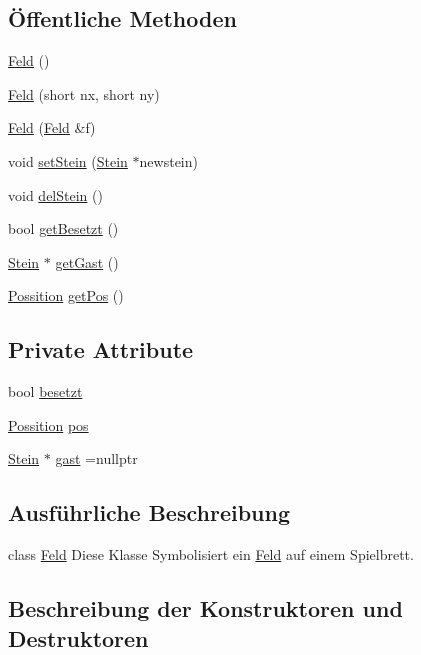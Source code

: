 \subsection*{Öffentliche Methoden}
\begin{DoxyCompactItemize}
\item 
\hyperlink{class_feld_a8a3098df53c8ae2ef988d0d2e34be1db}{Feld} ()
\item 
\hyperlink{class_feld_a5305572f4799035e118ff6c5e87df7f3}{Feld} (short nx, short ny)
\item 
\hyperlink{class_feld_a6594ff1a9881daa807483ea3754e16d0}{Feld} (\hyperlink{class_feld}{Feld} \&f)
\item 
void \hyperlink{class_feld_a00d3eec0ced82a8aee97de9b5f030df2}{set\+Stein} (\hyperlink{class_stein}{Stein} $\ast$newstein)
\item 
void \hyperlink{class_feld_a6bb4ad9a5e5ba0b7c50e43b149535a5c}{del\+Stein} ()
\item 
bool \hyperlink{class_feld_a70456d20a55214db1af93ccab6d192cd}{get\+Besetzt} ()
\item 
\hyperlink{class_stein}{Stein} $\ast$ \hyperlink{class_feld_a41f1e0c497b688ac87d6ab95c9b4914d}{get\+Gast} ()
\item 
\hyperlink{struct_possition}{Possition} \hyperlink{class_feld_adaeedb54cddaa27a5081237b60389bd3}{get\+Pos} ()
\end{DoxyCompactItemize}
\subsection*{Private Attribute}
\begin{DoxyCompactItemize}
\item 
bool \hyperlink{class_feld_aae4074e0032cce9eb0162394c639a4a0}{besetzt}
\item 
\hyperlink{struct_possition}{Possition} \hyperlink{class_feld_a1ac2c5d077b149682a32a238aec77991}{pos}
\item 
\hyperlink{class_stein}{Stein} $\ast$ \hyperlink{class_feld_a95773640265709ae8632d6a91655575d}{gast} =nullptr
\end{DoxyCompactItemize}


\subsection{Ausführliche Beschreibung}
class \hyperlink{class_feld}{Feld} Diese Klasse Symbolisiert ein \hyperlink{class_feld}{Feld} auf einem Spielbrett. 

\subsection{Beschreibung der Konstruktoren und Destruktoren}
\hypertarget{class_feld_a8a3098df53c8ae2ef988d0d2e34be1db}{}
